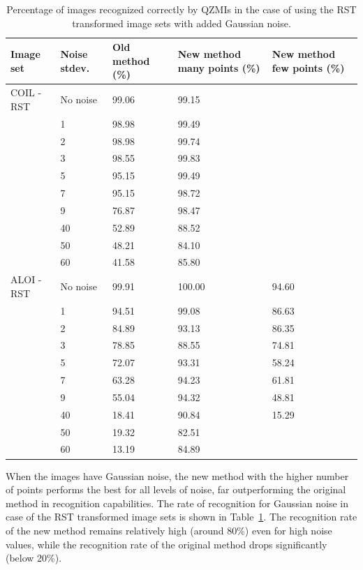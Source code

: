 \begin{table}[tbp]
    \centering
    \begin{tabular}{|p{2.15cm}|p{1.8cm}|p{3cm}|p{2.74cm}|p{2.6cm}|} \hline
        \textbf{Image set} & \textbf{Noise stdev.} & \textbf{Old method} (\%) & \textbf{New method} many points (\%)& \textbf{New method} few points (\%) \\ \hline\hline
        COIL - RST & No noise & 99.06 & 99.15 &  \\ \cline{2-5}
        & 1 & 98.98 & 99.49 &  \\ \cline{2-5}
        & 2 & 98.98 & 99.74 &  \\ \cline{2-5}
        & 3 & 98.55 & 99.83 &  \\ \cline{2-5}
        & 5 & 95.15 & 99.49 &  \\ \cline{2-5}
        & 7 & 95.15 & 98.72 &  \\ \cline{2-5}
        & 9 & 76.87 & 98.47 &  \\ \cline{2-5}
        & 40 & 52.89 & 88.52 &  \\ \cline{2-5}
        & 50 & 48.21 & 84.10 &  \\ \cline{2-5}
        & 60 & 41.58 & 85.80 &  \\ \cline{1-5}
        ALOI - RST & No noise & 99.91 & 100.00 & 94.60 \\ \cline{2-5}
        & 1 & 94.51 & 99.08 & 86.63 \\ \cline{2-5}
        & 2 & 84.89 & 93.13 & 86.35 \\ \cline{2-5}
        & 3 & 78.85 & 88.55 & 74.81 \\ \cline{2-5}
        & 5 & 72.07 & 93.31 & 58.24 \\ \cline{2-5}
        & 7 & 63.28 & 94.23 & 61.81 \\ \cline{2-5}
        & 9 & 55.04 & 94.32 & 48.81 \\ \cline{2-5}
        & 40 & 18.41 & 90.84 & 15.29 \\ \cline{2-5}
        & 50 & 19.32 & 82.51 &  \\ \cline{2-5}
        & 60 & 13.19 & 84.89 &  \\ \cline{1-5}
    \end{tabular}
    \caption{Percentage of images recognized correctly by QZMIs in the case of using the RST transformed image sets with added Gaussian noise.}
    \label{tab:recognition_gauss}
\end{table}
When the images have Gaussian noise, the new method with the higher number of points performs the best for all levels of noise, far outperforming the original method in recognition capabilities. 
The rate of recognition for Gaussian noise in case of the RST transformed image sets is shown in Table~\ref{tab:recognition_gauss}. The recognition rate of the new method remains relatively high (around 80\%) even for high noise values, while the recognition rate of the original method drops significantly (below 20\%).

